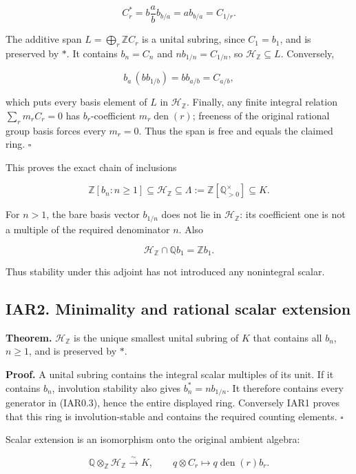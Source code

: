 \documentclass[
]{article}
\begin{document}
\[
C_r^*=b\frac ab b_{b/a}=a b_{b/a}=C_{1/r}.
\]

The additive span \(L=\bigoplus_r\mathbb Z C_r\) is a unital subring,
since \(C_1=b_1\), and is preserved by \(*\). It contains \(b_n=C_n\)
and \(n b_{1/n}=C_{1/n}\), so \(\mathcal H_{\mathbb Z}\subseteq L\).
Conversely,

\[
b_a\,(b b_{1/b})=b b_{a/b}=C_{a/b},
\]

which puts every basis element of \(L\) in \(\mathcal H_{\mathbb Z}\).
Finally, any finite integral relation \(\sum_r m_r C_r=0\) has
\(b_r\)-coefficient \(m_r\operatorname{den}(r)\); freeness of the
original rational group basis forces every \(m_r=0\). Thus the span is
free and equals the claimed ring. \(\square\)

This proves the exact chain of inclusions

\[
\mathbb Z[b_n:n\ge1]
\subseteq\mathcal H_{\mathbb Z}
\subseteq\Lambda:=\mathbb Z[\mathbb Q_{>0}^{\times}]
\subseteq K.
\tag{IAR1.3}
\]

For \(n>1\), the bare basis vector \(b_{1/n}\) does not lie in
\(\mathcal H_{\mathbb Z}\): its coefficient one is not a multiple of the
required denominator \(n\). Also

\[
\mathcal H_{\mathbb Z}\cap\mathbb Q b_1=\mathbb Z b_1.
\tag{IAR1.4}
\]

Thus stability under this adjoint has not introduced any nonintegral
scalar.

\subsection{IAR2. Minimality and rational scalar
extension}\label{iar2.-minimality-and-rational-scalar-extension}

\textbf{Theorem.} \(\mathcal H_{\mathbb Z}\) is the unique smallest
unital subring of \(K\) that contains all \(b_n\), \(n\ge1\), and is
preserved by \(*\).

\textbf{Proof.} A unital subring contains the integral scalar multiples
of its unit. If it contains \(b_n\), involution stability also gives
\(b_n^*=n b_{1/n}\). It therefore contains every generator in (IAR0.3),
hence the entire displayed ring. Conversely IAR1 proves that this ring
is involution-stable and contains the required counting elements.
\(\square\)

Scalar extension is an isomorphism onto the original ambient algebra:

\[
\boxed{
\mathbb Q\otimes_{\mathbb Z}\mathcal H_{\mathbb Z}
\xrightarrow{\sim}K,\qquad q\otimes C_r\longmapsto
q\operatorname{den}(r)b_r.}
\tag{IAR2.1}
\]
\end{document}
